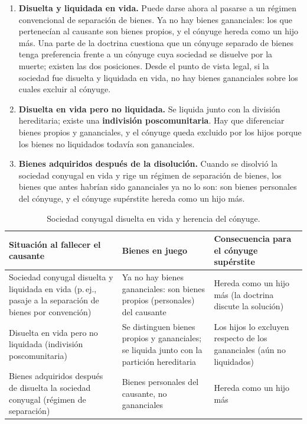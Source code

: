 \documentclass[12pt,oneside]{book}
\begin{document}
\begin{enumerate}
    \item \textbf{Disuelta y liquidada en vida.} Puede darse ahora al pasarse a un régimen convencional de separación de bienes. Ya no hay bienes gananciales: los que pertenecían al causante son bienes propios, y el cónyuge hereda como un hijo más. Una parte de la doctrina cuestiona que un cónyuge separado de bienes tenga preferencia frente a un cónyuge cuya sociedad se disuelve por la muerte; existen las dos posiciones. Desde el punto de vista legal, si la sociedad fue disuelta y liquidada en vida, no hay bienes gananciales sobre los cuales excluir al cónyuge.
    \item \textbf{Disuelta en vida pero no liquidada.} Se liquida junto con la división hereditaria; existe una \textbf{indivisión poscomunitaria}. Hay que diferenciar bienes propios y gananciales, y el cónyuge queda excluido por los hijos porque los bienes no liquidados todavía son gananciales.
    \item \textbf{Bienes adquiridos después de la disolución.} Cuando se disolvió la sociedad conyugal en vida y rige un régimen de separación de bienes, los bienes que antes habrían sido gananciales ya no lo son: son bienes personales del cónyuge, y el cónyuge supérstite hereda como un hijo más.
\end{enumerate}

\begin{table}[H]
\centering
\small
\begin{tabularx}{\textwidth}{
    >{\raggedright\arraybackslash}p{4.4cm}
    >{\raggedright\arraybackslash}X
    >{\raggedright\arraybackslash}p{3.6cm}
}
\toprule
\textbf{Situación al fallecer el causante} & \textbf{Bienes en juego} & \textbf{Consecuencia para el cónyuge supérstite} \\
\midrule
Sociedad conyugal disuelta y liquidada en vida (p.\,ej., pasaje a la separación de bienes por convención) & Ya no hay bienes gananciales: son bienes propios (personales) del causante & Hereda como un hijo más (la doctrina discute la solución) \\
\addlinespace
Disuelta en vida pero no liquidada (indivisión poscomunitaria) & Se distinguen bienes propios y gananciales; se liquida junto con la partición hereditaria & Los hijos lo excluyen respecto de los gananciales (aún no liquidados) \\
\addlinespace
Bienes adquiridos después de disuelta la sociedad conyugal (régimen de separación) & Bienes personales del causante, no gananciales & Hereda como un hijo más \\
\bottomrule
\end{tabularx}
\caption*{Sociedad conyugal disuelta en vida y herencia del cónyuge.}
\end{table}
\end{document}
